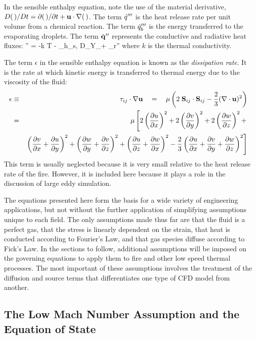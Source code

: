 \documentclass[11pt]{book}
\begin{document}
In the sensible enthalpy equation,
note the use of the material derivative, $D(\,)/Dt=\partial(\,) /\partial t + {\bf u} \cdot \nabla (\,)$. The term
$\dot{q}'''$ is the heat release rate per unit volume from a chemical reaction. The term $\dot{q}_b'''$ is the energy transferred to the evaporating droplets.
The term
$\dot{\bf q}''$ represents the conductive and radiative heat fluxes:
\be \dbq'' = -k \nabla T - \sum_\alpha h_{s,\alpha} \rho D_\alpha \nabla Y_\alpha + \dbq_r'' \ee
where $k$ is the thermal conductivity.

The term $\epsilon$ in the sensible enthalpy equation is known
as the {\em dissipation rate}. It is the rate at which kinetic energy is transferred to thermal energy due to the
viscosity of the fluid:
\begin{eqnarray}
\epsilon &\equiv& {\bf \tau}_{ij} \cdot \nabla {\bf u} \quad =  \quad
   \mu \left( 2 \; {\bf S}_{ij} \cdot {\bf S}_{ij}
                  - \frac{2}{3} (\nabla \cdot {\bf u})^2 \right) \\
  &=& \mu \left[ 2 \left(\frac{\partial u}{\partial x}\right)^2
 + 2 \left(\frac{\partial v}{\partial y}\right)^2 + 2 \left(\frac{\partial w}{\partial z}\right)^2 + \right. \\
& & \left.
  \left(\frac{\partial v}{\partial x}+\frac{\partial u}{\partial y}\right)^2 + \left(\frac{\partial w}{\partial y}+\frac{\partial v}{\partial z}\right)^2
 + \left(\frac{\partial u}{\partial z}+\frac{\partial w}{\partial x}\right)^2 - \frac{2}{3}
   \left(\frac{\partial u}{\partial x}+\frac{\partial v}{\partial y} + \frac{\partial w}{\partial z} \right)^2  \right]  \label{dissipation} \end{eqnarray}
This term is usually neglected because it is very small relative to the heat release rate of
the fire. However, it is included here because it plays a role in the discussion of large eddy simulation.

The equations presented here form the basis for a wide variety of engineering applications, but not without
the further application of simplifying assumptions unique to each field.
The only assumptions made thus far are that the fluid is a perfect gas, that the stress is
linearly dependent on the strain, that heat is conducted according to Fourier's Law, and that gas species diffuse according to
Fick's Law. In the sections to follow, additional assumptions will be
imposed on the governing equations to apply them to fire and other low speed thermal processes.
The most important of these assumptions involves the treatment of the diffusion and source
terms that differentiates one type of CFD model from
another.




\subsection{The Low Mach Number Assumption and the Equation of State}
\end{document}
